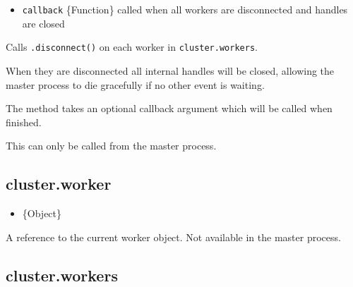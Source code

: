 \begin{itemize}
\itemsep1pt\parskip0pt
\item
  \texttt{callback} \{Function\} called when all workers are
  disconnected and handles are closed
\end{itemize}

Calls \texttt{.disconnect()} on each worker in \texttt{cluster.workers}.

When they are disconnected all internal handles will be closed, allowing
the master process to die gracefully if no other event is waiting.

The method takes an optional callback argument which will be called when
finished.

This can only be called from the master process.

\subsection{cluster.worker}\label{cluster.worker}

\begin{itemize}
\itemsep1pt\parskip0pt
\item
  \{Object\}
\end{itemize}

A reference to the current worker object. Not available in the master
process.

\begin{Shaded}
\begin{Highlighting}[]
 \NormalTok{(}\NormalTok{);}

 \NormalTok{(}\NormalTok{) \{}
  \NormalTok{(}\NormalTok{);}
  \NormalTok{();}
  \NormalTok{();}
\NormalTok{\} }  \NormalTok{(}\NormalTok{) \{}
  \NormalTok{(} \NormalTok{+ }\NormalTok{);}
\NormalTok{\}}
\end{Highlighting}
\end{Shaded}

\subsection{cluster.workers}\label{cluster.workers}

